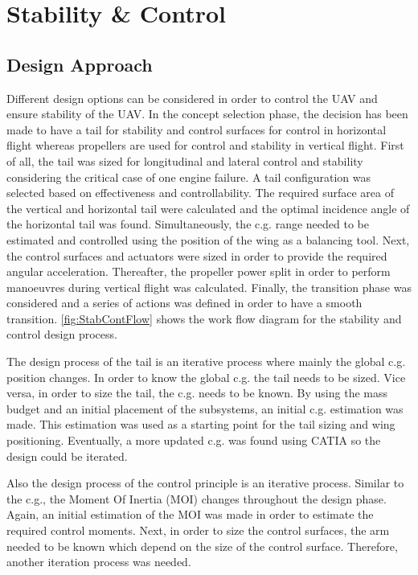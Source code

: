 \chapter{Stability \& Control}
\setlength{\parindent}{15pt}
\label{ch:stab_cont}

\section{Design Approach}

Different design options can be considered in order to control the UAV and ensure stability of the UAV. In the concept selection phase, the decision has been made to have a tail for stability and control surfaces for control in horizontal flight whereas propellers are used for control and stability in vertical flight. First of all, the tail was sized for longitudinal and lateral control and stability considering the critical case of one engine failure. A tail configuration was selected based on effectiveness and controllability. The required surface area of the vertical and horizontal tail were calculated and the optimal incidence angle of the horizontal tail was found. Simultaneously, the c.g. range needed to be estimated and controlled using the position of the wing as a balancing tool. Next, the control surfaces and actuators were sized in order to provide the required angular acceleration. Thereafter, the propeller power split in order to perform manoeuvres during vertical flight was calculated. Finally, the transition phase was considered and a series of actions was defined in order to have a smooth transition. \autoref{fig:StabContFlow} shows the work flow diagram for the stability and control design process. %

The design process of the tail is an iterative process where mainly the global c.g. position changes. In order to know the global c.g. the tail needs to be sized. Vice versa, in order to size the tail, the c.g. needs to be known. By using the mass budget and an initial placement of the subsystems, an initial c.g. estimation was made. This estimation was used as a starting point for the tail sizing and wing positioning. Eventually, a more updated c.g. was found using CATIA so the design could be iterated. %

Also the design process of the control principle is an iterative process. Similar to the c.g., the Moment Of Inertia (MOI) changes throughout the design phase. Again, an initial estimation of the MOI was made in order to estimate the required control moments. Next, in order to size the control surfaces, the arm needed to be known which depend on the size of the control surface. Therefore, another iteration process was needed. %

